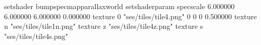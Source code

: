 setshader bumpspecmapparallaxworld
setshaderparam specscale 6.000000 6.000000 6.000000 0.000000
texture 0 "ses/tiles/tile4.png" 0 0 0 0.500000
texture n "ses/tiles/tile1n.png"
texture z "ses/tiles/tile4z.png"
texture s "ses/tiles/tile4s.png"

